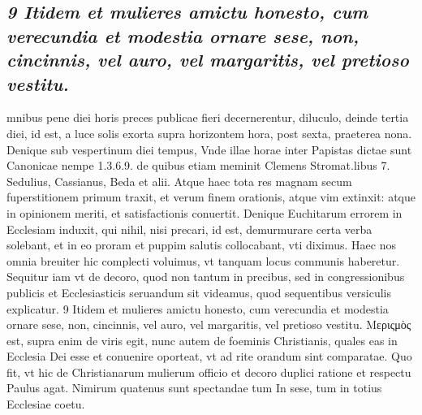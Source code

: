 \documentclass{article}
\begin{document}
\begin{pages}
\subsection*{\textit{9 Itidem et mulieres amictu honesto, cum verecundia et modestia ornare sese, non, cincinnis, vel auro, vel margaritis, vel pretioso vestitu.}}mnibus pene diei horis preces publicae fieri decernerentur, diluculo, deinde tertia diei, id est, a luce solis exorta supra horizontem hora, post sexta, praeterea nona. Denique sub vespertinum diei tempus, Vnde illae horae inter Papistas dictae sunt Canonicae nempe 1.3.6.9. de quibus etiam meminit Clemens Stromat.libus 7. Sedulius, Cassianus, Beda et alii. Atque haec tota res magnam secum fuperstitionem primum traxit, et verum finem orationis, atque vim extinxit: atque in opinionem meriti, et satisfactionis conuertit. Denique Euchitarum errorem in Ecclesiam induxit, qui nihil, nisi precari, id est, demurmurare certa verba solebant, et in eo proram et puppim salutis collocabant, vti diximus. Haec nos omnia breuiter hic complecti voluimus, vt tanquam locus communis haberetur. Sequitur iam vt de decoro, quod non tantum in precibus, sed in congressionibus publicis et Ecclesiasticis seruandum sit videamus, quod sequentibus versiculis explicatur. 9 Itidem et mulieres amictu honesto, cum verecundia et modestia ornare sese, non, cincinnis, vel auro, vel margaritis, vel pretioso vestitu. Μεριςμὸς est, supra enim de viris egit, nunc autem de foeminis Christianis, quales eas in Ecclesia Dei esse et conuenire oporteat, vt ad rite orandum sint comparatae. Quo fit, vt hic de Christianarum mulierum officio et decoro duplici ratione et respectu Paulus agat. Nimirum quatenus sunt spectandae tum In sese, tum in totius Ecclesiae coetu.  \pend

\end{pages}
\end{document}
